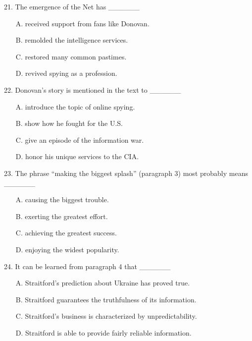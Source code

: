\documentclass[UTF8,11pt]{ctexart}
\begin{document}
21. The emergence of the Net has \_\_\_\_\_\_


\begin{itemize}[leftmargin=2em,itemsep=.2em,topsep=.4em]\item[A.] received support from fans like Donovan.
\item[B.] remolded the intelligence services.
\item[C.] restored many common pastimes.
\item[D.] revived spying as a profession.
\end{itemize}

22. Donovan’s story is mentioned in the text to \_\_\_\_\_\_


\begin{itemize}[leftmargin=2em,itemsep=.2em,topsep=.4em]\item[A.] introduce the topic of online spying.
\item[B.] show how he fought for the U.S.
\item[C.] give an episode of the information war.
\item[D.] honor his unique services to the CIA.
\end{itemize}

23. The phrase “making the biggest splash” (paragraph 3) most probably means \_\_\_\_\_\_


\begin{itemize}[leftmargin=2em,itemsep=.2em,topsep=.4em]\item[A.] causing the biggest trouble.
\item[B.] exerting the greatest effort.
\item[C.] achieving the greatest success.
\item[D.] enjoying the widest popularity.
\end{itemize}

24. It can be learned from paragraph 4 that \_\_\_\_\_\_


\begin{itemize}[leftmargin=2em,itemsep=.2em,topsep=.4em]\item[A.] Straitford’s prediction about Ukraine has proved true.
\item[B.] Straitford guarantees the truthfulness of its information.
\item[C.] Straitford’s business is characterized by unpredictability.
\item[D.] Straitford is able to provide fairly reliable information.
\end{itemize}
\end{document}
